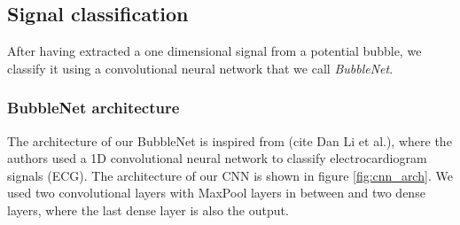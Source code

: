 		
		\subsection{Signal classification}
		After having extracted a one dimensional signal from a potential bubble, we classify it using a convolutional neural network that we call \textit{BubbleNet}. 

		\subsubsection{BubbleNet architecture}		
		The architecture of our BubbleNet is inspired from (cite Dan Li et al.), where the authors used a 1D convolutional neural network to classify electrocardiogram signals (ECG). The architecture of our CNN is shown in figure \ref{fig:cnn_arch}. We used two convolutional layers with MaxPool layers in between and two dense layers, where the last dense layer is also the output. 
		
